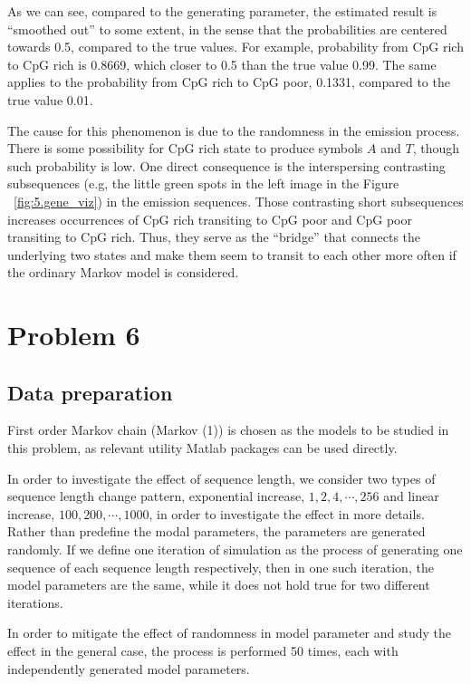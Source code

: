 \documentclass[paper=a4, fontsize=11pt]{scrartcl} %
\numberwithin{equation}{section} %
\numberwithin{figure}{section} %
\numberwithin{table}{section} %
\begin{document}
As we can see, compared to the generating parameter, the estimated result is ``smoothed out'' to some extent, in the sense that the probabilities are centered towards 0.5, compared to the true values. For example, probability from CpG rich to CpG rich is 0.8669, which closer to 0.5 than the true value 0.99. The same applies to the probability from CpG rich to CpG poor, 0.1331, compared to the true value 0.01.

The cause for this phenomenon is due to the randomness in the emission process. There is some possibility for CpG rich state to produce symbols $A$ and $T$, though such probability is low. One direct consequence is the interspersing contrasting subsequences (e.g, the little green spots in the left image in the Figure ~\ref{fig:5.gene_viz}) in the emission sequences. Those contrasting short subsequences increases occurrences of CpG rich transiting to CpG poor and CpG poor transiting to CpG rich. Thus, they serve as the ``bridge'' that connects the underlying two states and make them seem to transit to each other more often if the ordinary Markov model is considered.

\section {Problem 6}
\subsection {Data preparation}
First order Markov chain (Markov (1)) is chosen as the models to be studied in this problem, as relevant utility Matlab packages can be used directly.

In order to investigate the effect of sequence length, we consider two types of sequence length change pattern, exponential increase, $1, 2, 4, \cdots, 256$ and linear increase, $100, 200, \cdots, 1000$, in order to investigate the effect in more details. Rather than predefine the modal parameters, the parameters are generated randomly. If we define one iteration of simulation as the process of generating one sequence of each sequence length respectively, then in one such iteration, the model parameters are the same, while it does not hold true for two different iterations.

In order to mitigate the effect of randomness in model parameter and study the effect in the general case, the process is performed 50 times, each with independently generated model parameters.
\end{document}
